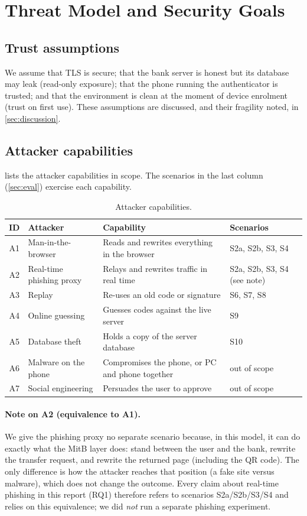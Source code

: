 \section{Threat Model and Security Goals}\label{sec:threat}

\subsection{Trust assumptions}
We assume that TLS is secure; that the bank server is honest but its database
may leak (read-only exposure); that the phone running the authenticator is
trusted; and that the environment is clean at the moment of device enrolment
(trust on first use). These assumptions are discussed, and their fragility noted,
in \cref{sec:discussion}.

\subsection{Attacker capabilities}
 lists the attacker capabilities in scope. The scenarios in
the last column (\cref{sec:eval}) exercise each capability.

\begin{table}[htbp]
\centering
\caption{Attacker capabilities.}
\label{tab:attackers}
\small
\begin{tabularx}{\linewidth}{@{}clXl@{}}
\toprule
ID & Attacker & Capability & Scenarios \\
\midrule
A1 & Man-in-the-browser     & Reads and rewrites everything in the browser & S2a, S2b, S3, S4 \\
A2 & Real-time phishing proxy & Relays and rewrites traffic in real time & S2a, S2b, S3, S4 (see note) \\
A3 & Replay                 & Re-uses an old code or signature & S6, S7, S8 \\
A4 & Online guessing        & Guesses codes against the live server & S9 \\
A5 & Database theft         & Holds a copy of the server database & S10 \\
A6 & Malware on the phone   & Compromises the phone, or PC and phone together & out of scope \\
A7 & Social engineering     & Persuades the user to approve & out of scope \\
\bottomrule
\end{tabularx}
\end{table}

\paragraph{Note on A2 (equivalence to A1).}
We give the phishing proxy no separate scenario because, in this model, it can do
exactly what the MitB layer does: stand between the user and the bank, rewrite
the transfer request, and rewrite the returned page (including the QR code). The
only difference is how the attacker reaches that position (a fake site versus
malware), which does not change the outcome. Every claim about real-time
phishing in this report (RQ1) therefore refers to scenarios S2a/S2b/S3/S4 and
relies on this equivalence; we did \emph{not} run a separate phishing
experiment.


